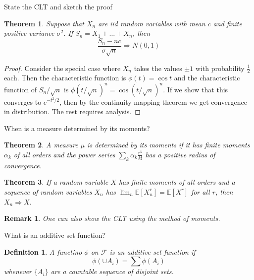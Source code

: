 \documentclass[avery5388,grid,frame]{flashcards}
\newcommand{\E}{\mathbb{E}}
\newcommand{\F}{\mathcal F}
\newtheorem*{theorem}{Theorem}
\newtheorem*{definition}{Definition}
\newtheorem*{remark}{Remark}
\begin{document}
\begin{flashcard}
    {State the CLT and sketch the proof}
    \begin{theorem}
        Suppose that $X_n$ are iid random variables with mean $c$ and finite positive variance $\sigma^2$. If $S_n = X_1 + \dots + X_n$, then
        $$\frac{S_n - nc}{\sigma \sqrt n} \Rightarrow N(0,1)$$
    \end{theorem}

    \begin{proof}
        Consider the special case where $X_n$ takes the values $\pm 1$ with probability $\frac 1 2$ each. Then the characteristic function is $\phi(t) = \cos t$ and the characteristic function of $S_n / \sqrt n$ is $\phi(t / \sqrt n)^n = \cos(t / \sqrt n)^n$. If we show that this converges to $e^{-t^2/2}$, then by the continuity mapping theorem we get convergence in distribution. The rest requires analysis.
    \end{proof}
\end{flashcard}


\begin{flashcard}
    {When is a measure determined by its moments?}
    \begin{theorem}
        A measure $\mu$ is determined by its moments if it has finite moments $\alpha_k$ of all orders and the power series $\sum_k \alpha_k \frac{r^k}{k!}$ has a positive radius of convergence.
    \end{theorem}

    \begin{theorem}
        If a random variable $X$ has finite moments of all orders and a sequence of random variables $X_n$ has $\lim_n \E[X_n^r] = \E[X^r]$ for all $r$, then $X_n \Rightarrow X$.
    \end{theorem}

    \begin{remark}
        One can also show the CLT using the method of moments.
    \end{remark}
\end{flashcard}


\begin{flashcard}
    {What is an additive set function?}
    \begin{definition}
        A functino $\phi$ on $\F$ is an additive set function if
        $$\phi(\cup A_i) = \sum \phi(A_i)$$
        whenever $\{ A_i \}$ are a countable sequence of disjoint sets.
    \end{definition}
\end{flashcard}
\end{document}

